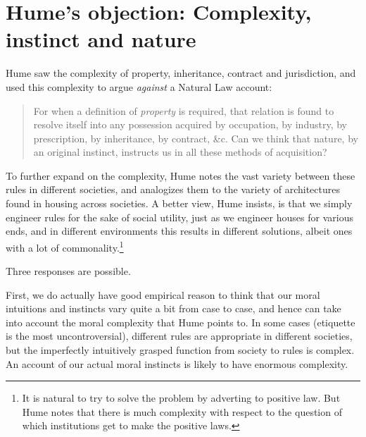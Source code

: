 \section{Hume's objection: Complexity, instinct and nature}
Hume saw the complexity of property, inheritance, contract and jurisdiction, and used this complexity to 
argue \textit{against} a Natural Law account: 
\begin{quote}
For when a definition of \textit{property} is required, that relation is found to resolve itself into any
possession acquired by occupation, by industry, by prescription, by inheritance, by contract, \&c. Can
we think that nature, by an original instinct, instructs us in all these methods of acquisition?
\parencite[III.II]{HumeMorals}
\end{quote}

To further expand on the complexity, Hume notes the vast variety between these rules in different societies,
and analogizes them to the variety of architectures found in housing across societies. A better view,
Hume insists, is that we simply engineer rules for the sake of social utility, just as we engineer houses
for various ends, and in different environments this results in different solutions, albeit ones with a
lot of commonality.\footnote{It is natural to try to solve the problem by adverting to positive law. But
Hume notes that there is much complexity with respect to the question of which institutions get to make
the positive laws.}

Three responses are possible. 

First, we do actually have good empirical reason to think that our moral 
intuitions and instincts vary quite a bit from case to case, and hence can take into account the moral
complexity that Hume points to. In some cases (etiquette is the most uncontroversial), different rules are 
appropriate in different societies, but the imperfectly intuitively grasped function from society to rules is 
complex. An account of our actual moral instincts 
is likely to have enormous complexity. 

